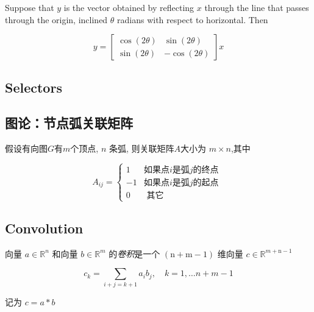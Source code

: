 \begin{example}
    Suppose that $y$ is the vector obtained by reflecting $x$ through the line
    that passes through the origin, inclined $\theta$ radians with respect to horizontal. Then

    $$ y=\left[\begin{array}{rr}\cos (2 \theta) & \sin (2 \theta) \\ \sin (2 \theta) & -\cos (2 \theta)\end{array}\right] x $$
\end{example}

\subsection{Selectors}

\begin{definition}
    
\end{definition}

\begin{definition}[Downsampling]
    
\end{definition}

\subsection{图论：节点弧关联矩阵}

\begin{definition}[关联矩阵]
   假设有向图$G$有$m$个顶点,  $ n $ 条弧, 则关联矩阵$A$大小为 $ m \times n $,其中 

   $$ A_{i j}=\left\{\begin{array}{ll}1 & \text{如果点} i \text{是弧} j \text{的终点 } \\ -1 & \text {如果点}i \text{是弧}j \text{的起点} \\ 0 & \text { 其它 }\end{array}\right. $$
\end{definition}

\subsection{Convolution}

\begin{definition}[一维卷积]
    向量 $ a \in \mathbb{R}^{n} $ 和向量 $ b \in \mathbb{R}^{m} $ 的\textit{卷积}是一个 $ (\mathrm{n}+\mathrm{m}-1) $ 维向量 $ c \in \mathbb{R}^{m+\mathrm{n}-1} $

    $$ c_{k}=\sum_{i+j=k+1} a_{i} b_{j}, \quad k=1, \ldots n+m-1 $$

    记为 $ c=a * b$
\end{definition}

